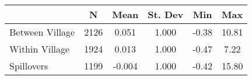 \begin{tabular}{l*{5}{c}}\hline&\multicolumn{1}{c}{N}&\multicolumn{1}{c}{Mean}&\multicolumn{1}{c}{St. Dev}&\multicolumn{1}{c}{Min}&\multicolumn{1}{c}{Max}\\ \hline 
Between Village & 2126 & 0.051 & 1.000 & -0.38 & 10.81 \\
Within Village & 1924 & 0.013 & 1.000 & -0.47 & 7.22 \\
Spillovers & 1199 & -0.004 & 1.000 & -0.42 & 15.80 \\
\hline \end{tabular}
